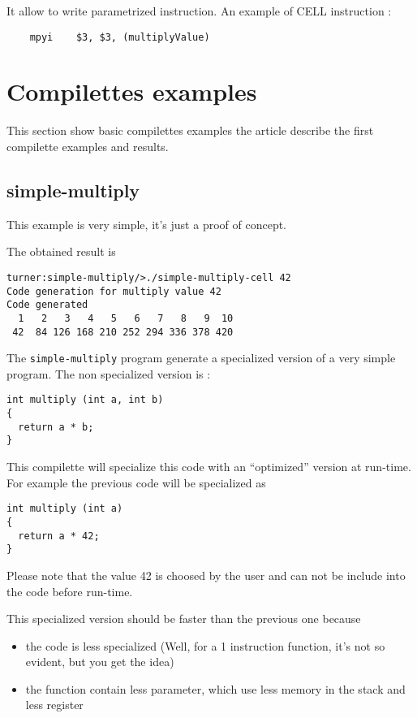 \documentclass{article}
\begin{document}
It allow to write parametrized instruction. An example of CELL
instruction :
\begin{verbatim}
	mpyi    $3, $3, (multiplyValue) 
\end{verbatim}

\section{Compilettes examples}

This section show basic compilettes examples the article \cite{KB2004}
describe the first compilette examples and results.

\subsection{simple-multiply}

This example is very simple, it's just a proof of concept.

The obtained result is
\begin{verbatim}
turner:simple-multiply/>./simple-multiply-cell 42
Code generation for multiply value 42
Code generated
  1   2   3   4   5   6   7   8   9  10 
 42  84 126 168 210 252 294 336 378 420 
\end{verbatim}

The \texttt{simple-multiply} program generate a specialized version of
a very simple program. The non specialized version is :
\begin{verbatim}
int multiply (int a, int b)
{
  return a * b;
}
\end{verbatim}

This compilette will specialize this code with an ``optimized''
version at run-time. For example the previous code will be specialized
as
\begin{verbatim}
int multiply (int a)
{
  return a * 42;
}
\end{verbatim}

Please note that the value 42 is choosed by the user and can not be
include into the code before run-time.

This specialized version should be faster than the previous one because
\begin{itemize}
\item the code is less specialized (Well, for a 1 instruction
  function, it's not so evident, but you get the idea)
\item the function contain less parameter, which use less memory in
  the stack and less register
\end{itemize}
\end{document}
